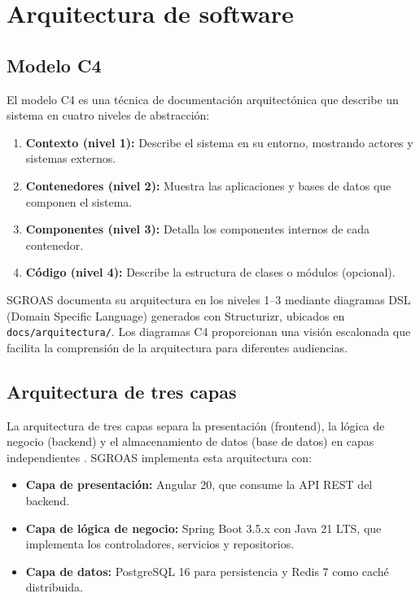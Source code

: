 \section{Arquitectura de software}
\label{sec:architecture-theory}

\subsection{Modelo C4}
\label{sec:c4}

El modelo C4 \cite{c4model} es una técnica de documentación arquitectónica que describe un sistema en cuatro niveles de abstracción:
\begin{enumerate}
  \item \textbf{Contexto (nivel 1):} Describe el sistema en su entorno, mostrando actores y sistemas externos.
  \item \textbf{Contenedores (nivel 2):} Muestra las aplicaciones y bases de datos que componen el sistema.
  \item \textbf{Componentes (nivel 3):} Detalla los componentes internos de cada contenedor.
  \item \textbf{Código (nivel 4):} Describe la estructura de clases o módulos (opcional).
\end{enumerate}

SGROAS documenta su arquitectura en los niveles 1--3 mediante diagramas DSL (Domain Specific Language) generados con Structurizr, ubicados en \texttt{docs/arquitectura/}. Los diagramas C4 proporcionan una visión escalonada que facilita la comprensión de la arquitectura para diferentes audiencias.

\subsection{Arquitectura de tres capas}
\label{sec:three-tier}

La arquitectura de tres capas separa la presentación (frontend), la lógica de negocio (backend) y el almacenamiento de datos (base de datos) en capas independientes \cite{martin2017}. SGROAS implementa esta arquitectura con:
\begin{itemize}
  \item \textbf{Capa de presentación:} Angular 20, que consume la API REST del backend.
  \item \textbf{Capa de lógica de negocio:} Spring Boot 3.5.x con Java 21 LTS, que implementa los controladores, servicios y repositorios.
  \item \textbf{Capa de datos:} PostgreSQL 16 para persistencia y Redis 7 como caché distribuida.
\end{itemize}

